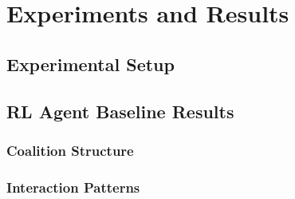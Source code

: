 \chapter{Experiments and Results} %
\label{ExperimentsAndResults}



\section{Experimental Setup}

\section{RL Agent Baseline Results}

\subsection{Coalition Structure}

\subsection{Interaction Patterns}

